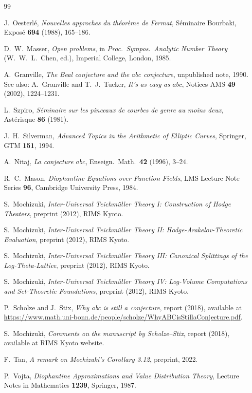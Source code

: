 \documentclass[12pt,a4paper]{article}
\theoremstyle{remark}
\begin{document}
\begin{thebibliography}{99}

J.~Oesterlé,
\textit{Nouvelles approches du théorème de Fermat},
Séminaire Bourbaki, Exposé \textbf{694} (1988), 165--186.

D.~W.~Masser,
\textit{Open problems},
in \textit{Proc.\ Sympos.\ Analytic Number Theory} (W.~W.~L.~Chen, ed.),
Imperial College, London, 1985.

A.~Granville,
\textit{The Beal conjecture and the $abc$ conjecture},
unpublished note, 1990.
See also: A.~Granville and T.~J.~Tucker,
\textit{It's as easy as $abc$},
Notices AMS \textbf{49} (2002), 1224--1231.

L.~Szpiro,
\textit{Séminaire sur les pinceaux de courbes de genre au moins deux},
Astérisque \textbf{86} (1981).

J.~H.~Silverman,
\textit{Advanced Topics in the Arithmetic of Elliptic Curves},
Springer, GTM \textbf{151}, 1994.

A.~Nitaj,
\textit{La conjecture $abc$},
Enseign.\ Math.\ \textbf{42} (1996), 3--24.

R.~C.~Mason,
\textit{Diophantine Equations over Function Fields},
LMS Lecture Note Series \textbf{96}, Cambridge University Press, 1984.

S.~Mochizuki,
\textit{Inter-Universal Teichmüller Theory I: Construction of Hodge Theaters},
preprint (2012), RIMS Kyoto.

S.~Mochizuki,
\textit{Inter-Universal Teichmüller Theory II: Hodge-Arakelov-Theoretic Evaluation},
preprint (2012), RIMS Kyoto.

S.~Mochizuki,
\textit{Inter-Universal Teichmüller Theory III: Canonical Splittings of the Log-Theta-Lattice},
preprint (2012), RIMS Kyoto.

S.~Mochizuki,
\textit{Inter-Universal Teichmüller Theory IV: Log-Volume Computations and Set-Theoretic Foundations},
preprint (2012), RIMS Kyoto.

P.~Scholze and J.~Stix,
\textit{Why abc is still a conjecture},
report (2018), available at \url{https://www.math.uni-bonn.de/people/scholze/WhyABCisStillaConjecture.pdf}.

S.~Mochizuki,
\textit{Comments on the manuscript by Scholze--Stix},
report (2018), available at RIMS Kyoto website.

F.~Tan,
\textit{A remark on Mochizuki's Corollary 3.12},
preprint, 2022.

P.~Vojta,
\textit{Diophantine Approximations and Value Distribution Theory},
Lecture Notes in Mathematics \textbf{1239}, Springer, 1987.

\end{thebibliography}
\end{document}

